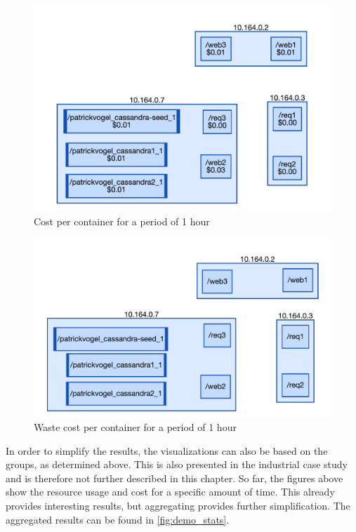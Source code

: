 \begin{figure}
    \centering
    \includegraphics[width=\textwidth]{gfx/demo_cost}
    \caption{Cost per container for a period of 1 hour}
    \label{fig:demo_cost}
\end{figure}

\begin{figure}
    \centering
    \includegraphics[width=\textwidth]{gfx/demo_app}
    \caption{Waste cost per container for a period of 1 hour}
    \label{fig:demo_waste}
\end{figure}

\noindent
In order to simplify the results, the visualizations can also be based on the groups, as determined above. This is also presented in the industrial case study and is therefore not further described in this chapter. So far, the figures above show the resource usage and cost for a specific amount of time. This already provides interesting results, but aggregating provides further simplification. The aggregated results can be found in \autoref{fig:demo_stats}.

